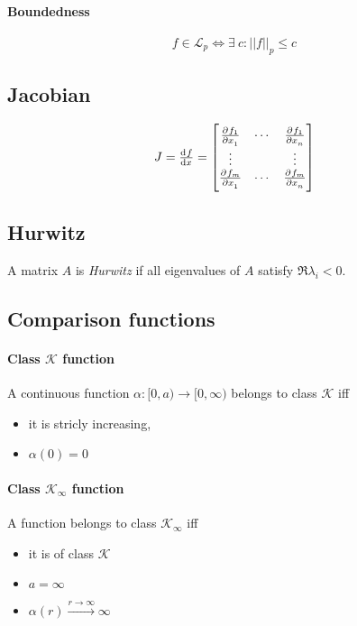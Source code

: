 \paragraph{Boundedness}
\begin{equation}
	f \in \mathscr{L}_p \Leftrightarrow \exists \: c : ||f||_p \leq c
\end{equation}

\subsection{Jacobian}
\begin{equation}
	J
	=
	\od{f}{x}
	=
	\begin{bmatrix}
		\pd{f_1}{x_1} & \cdots & \pd{f_1}{x_n} \\
		\vdots        &        & \vdots        \\
		\pd{f_m}{x_1} & \cdots & \pd{f_m}{x_n}
	\end{bmatrix}
\end{equation}

\subsection{Hurwitz}
A matrix $A$ is \emph{Hurwitz} if all eigenvalues of $A$ satisfy $\Re \lambda_i < 0$.

\subsection{Comparison functions}
\paragraph{Class $\mathcal{K}$ function}
A continuous function $\alpha : [0,a) \rightarrow [0, \infty)$ belongs to class $\mathcal{K}$ iff
\begin{itemize}
	\item it is stricly increasing,
	\item $\alpha(0) = 0$
\end{itemize}

\paragraph{Class $\mathcal{K}_\infty$ function}
A function belongs to class $\mathcal{K}_\infty$ iff
\begin{itemize}
	\item it is of class $\mathcal{K}$
	\item $a = \infty$
	\item $\alpha(r) \xrightarrow{r \rightarrow \infty} \infty$
\end{itemize}

